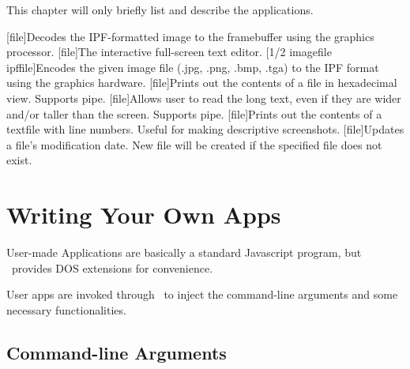 This chapter will only briefly list and describe the applications.

\begin{outline}
\1
\1
\1
\1
\1[file]{Decodes the IPF-formatted image to the framebuffer using the graphics processor.}
\1
\1[file]{The interactive full-screen text editor.}
\1[1/2 imagefile ipffile]{Encodes the given image file (.jpg, .png, .bmp, .tga) to the IPF format using the graphics hardware.}
\1
\1[file]{Prints out the contents of a file in hexadecimal view. Supports pipe.}
\1[file]{Allows user to read the long text, even if they are wider and/or taller than the screen. Supports pipe.}
\1[file]{Prints out the contents of a textfile with line numbers. Useful for making descriptive screenshots.}
\1[file]{Updates a file's modification date. New file will be created if the specified file does not exist.}
\1
\end{outline}



\chapter{Writing Your Own Apps}

User-made Applications are basically a standard Javascript program, but \thedos\ provides DOS extensions for convenience.

User apps are invoked through \thedos\ to inject the command-line arguments and some necessary functionalities.

\section{Command-line Arguments}

